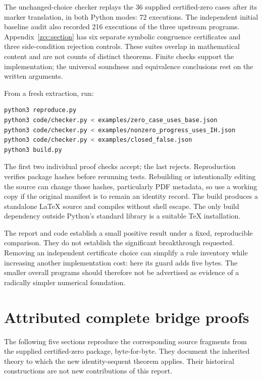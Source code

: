 \documentclass[11pt,letterpaper]{article}
\theoremstyle{definition}\newtheorem{definition}[theorem]{Definition}
\theoremstyle{remark}\newtheorem{remark}[theorem]{Remark}
\begin{document}
The unchanged-choice checker replays the 36 supplied certified-zero
cases after its marker translation, in both Python modes: 72 executions.
The independent initial baseline audit also recorded 216 executions of
the three upstream programs. Appendix~\ref{zcc:section} has six separate
symbolic congruence certificates and three side-condition rejection controls.
These suites overlap in mathematical content and are not counts of
distinct theorems. Finite checks support the implementation; the universal
soundness and equivalence conclusions rest on the written arguments.

From a fresh extraction, run:
\begin{lstlisting}[language=bash]
python3 reproduce.py
python3 code/checker.py < examples/zero_case_uses_base.json
python3 code/checker.py < examples/nonzero_progress_uses_IH.json
python3 code/checker.py < examples/closed_false.json
python3 build.py
\end{lstlisting}
The first two individual proof checks accept; the last rejects.
Reproduction verifies package hashes before rerunning tests. Rebuilding
or intentionally editing the source can change those hashes, particularly
PDF metadata, so use a working copy if the original manifest is to remain
an identity record. The build produces a standalone LaTeX source and
compiles without shell escape. The only build dependency outside Python's
standard library is a suitable TeX installation.

The report and code establish a small positive result under a fixed,
reproducible comparison. They do not establish the significant breakthrough
requested. Removing an independent certificate choice can simplify a rule
inventory while increasing another implementation cost: here its guard
adds five bytes. The smaller overall programs should therefore not be
advertised as evidence of a radically simpler numerical foundation.

\clearpage
\appendix
\section*{Attributed complete bridge proofs}
The following five sections reproduce the corresponding source fragments
from the supplied certified-zero package, byte-for-byte. They document the
inherited theory to which the new identity-sequent theorem applies. Their
historical constructions are not new contributions of this report.





\clearpage

\end{document}
